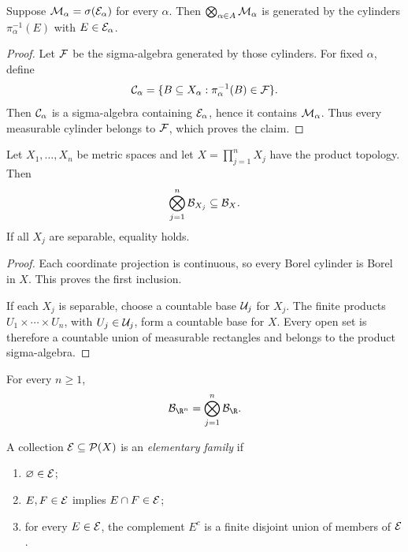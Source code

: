 \begin{prop}
Suppose $\mathcal{M}_\alpha=\sigma(\mathcal{E}_\alpha)$ for every $\alpha$. Then $\bigotimes_{\alpha\in A}\mathcal{M}_\alpha$ is generated by the cylinders $\pi_\alpha^{-1}(E)$ with $E\in\mathcal{E}_\alpha$.
\end{prop}

\begin{proof}
Let $\mathcal{F}$ be the sigma-algebra generated by those cylinders. For fixed $\alpha$, define
\[
\mathcal{C}_\alpha=\{B\subseteq X_\alpha:\pi_\alpha^{-1}(B)\in\mathcal{F}\}.
\]
Then $\mathcal{C}_\alpha$ is a sigma-algebra containing $\mathcal{E}_\alpha$, hence it contains $\mathcal{M}_\alpha$. Thus every measurable cylinder belongs to $\mathcal{F}$, which proves the claim.
\end{proof}

\begin{prop}
Let $X_1,\dots,X_n$ be metric spaces and let $X=\prod_{j=1}^nX_j$ have the product topology. Then
\[
\bigotimes_{j=1}^n\mathcal{B}_{X_j}\subseteq\mathcal{B}_X.
\]
If all $X_j$ are separable, equality holds.
\end{prop}

\begin{proof}
Each coordinate projection is continuous, so every Borel cylinder is Borel in $X$. This proves the first inclusion.

If each $X_j$ is separable, choose a countable base $\mathcal{U}_j$ for $X_j$. The finite products $U_1\times\cdots\times U_n$, with $U_j\in\mathcal{U}_j$, form a countable base for $X$. Every open set is therefore a countable union of measurable rectangles and belongs to the product sigma-algebra.
\end{proof}

\begin{cor}
For every $n\geq1$,
\[
\cB_{\R^n}=\bigotimes_{j=1}^n\cB_{\R}.
\]
\end{cor}

\begin{de}
A collection $\mathcal{E}\subseteq\mathcal{P}(X)$ is an \emph{elementary family} if
\begin{enumerate}
  \item $\varnothing\in\mathcal{E}$;
  \item $E,F\in\mathcal{E}$ implies $E\cap F\in\mathcal{E}$;
  \item for every $E\in\mathcal{E}$, the complement $E^c$ is a finite disjoint union of members of $\mathcal{E}$.
\end{enumerate}
\end{de}

